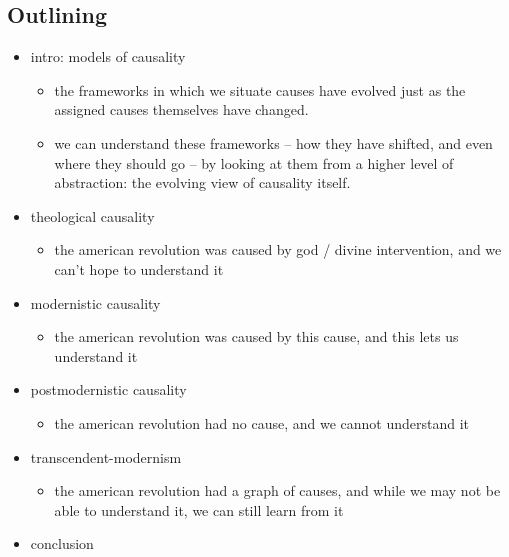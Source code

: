 \documentclass[letterpaper]{article}
\begin{document}
\subsection{Outlining}
\label{sec:org6efe298}
\begin{itemize}
\item intro: models of causality

\begin{itemize}
\item the frameworks in which we situate causes have evolved just as the
assigned causes themselves have changed.
\item we can understand these frameworks -- how they have shifted, and
even where they should go -- by looking at them from a higher level
of abstraction: the evolving view of causality itself.
\end{itemize}

\item theological causality

\begin{itemize}
\item the american revolution was caused by god / divine intervention, and
we can't hope to understand it
\end{itemize}

\item modernistic causality

\begin{itemize}
\item the american revolution was caused by this cause, and this lets us
understand it
\end{itemize}

\item postmodernistic causality

\begin{itemize}
\item the american revolution had no cause, and we cannot understand it
\end{itemize}

\item transcendent-modernism

\begin{itemize}
\item the american revolution had a graph of causes, and while we may not
be able to understand it, we can still learn from it
\end{itemize}

\item conclusion
\end{itemize}
\end{document}
